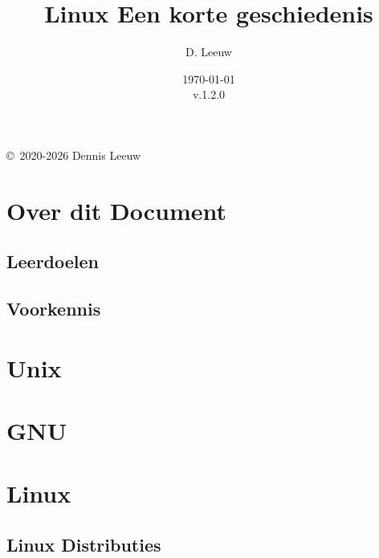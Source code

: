 \documentclass[a4paper,12pt,twoside,openright,titlepage]{article}
\author{D. Leeuw}
\title{Linux Een korte geschiedenis}
\date{\today\\v.1.2.0}
\begin{document}

\maketitle

\copyright\ 2020-2026 Dennis Leeuw\\




\section{Over dit Document}
\subsection{Leerdoelen}
\subsection{Voorkennis}


\section{Unix}


\section{GNU}


\section{Linux}

\subsection{Linux Distributies}


\printindex
\end{document}
